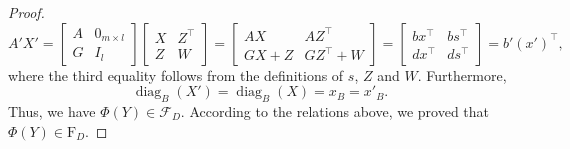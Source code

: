\documentclass[11pt]{article}
\theoremstyle{plain}
\def\F{\mathcal{F}}
\begin{document}
\begin{proof}
\[
A'X'
=\begin{bmatrix}
A&0_{m\times l}\\
 G&I_l
\end{bmatrix}\begin{bmatrix}
X&Z^\top\\
Z&W
\end{bmatrix}
=\begin{bmatrix}
AX&AZ^\top\\
GX+Z&GZ^\top+W
\end{bmatrix}
=\begin{bmatrix}
bx^\top&bs^\top\\
dx^\top&ds^\top
\end{bmatrix}
=b'(x')^\top,
\]
where the third equality follows from the definitions of $s$, $Z$ and $W$. Furthermore, 
\[
\operatorname{diag}_B(X')=\operatorname{diag}_B(X)=x_B=x'_B.
\] 
Thus, we have $\Phi(Y)\in \F_D$. According to the relations above, we proved that $\Phi(Y)\in{\mathrm{F}_D}$.
\smallskip


\end{proof}
\end{document}
